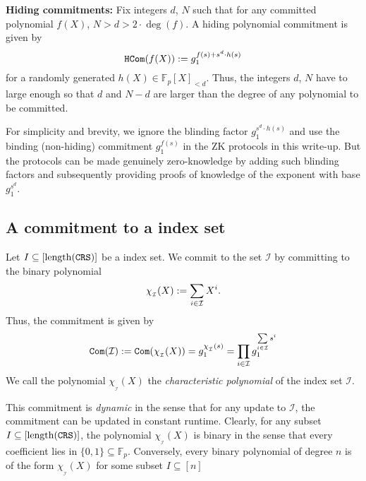 \documentclass[11pt, lettersize, notitlepage, leqno, footskip=0.6cm]{article}
\newcommand{\bFp}{\mathbb{F}_p}
\newcommand{\mc}{\mathcal}
\newcommand{\mr}{\mathrm}
\newcommand{\sub}{\subseteq}
\newcommand{\vs}{\vspace{-0.15cm}}
\newcommand{\noin}{\noindent}
\numberwithin{equation}{section}
\begin{document}
\bigskip





\begin{mdframed}

\noin \hypertarget{Hide}{\textbf{Hiding commitments:}} Fix integers $d$, $N$ such that for any committed polynomial $f(X)$, $N> d > 2\cdot \deg(f).$ A hiding polynomial commitment is given by \vs $${\tt{HCom}}(f(X)):= g_1^{f(s)+ s^d\cdot h(s)} $$ for a randomly generated $h(X)\in \bFp[X]_{< d}$. Thus, the integers $d$, $N$ have to large enough so that $d$ and $N-d$ are larger than the degree of any polynomial to be committed.

For simplicity and brevity, we ignore the blinding factor $g_1^{s^d\cdot h(s)}$ and use the binding (non-hiding) commitment $g_1^{f(s)}$ in the ZK protocols in this write-up. But the protocols can be made genuinely zero-knowledge by adding such blinding factors and subsequently providing proofs of knowledge of the exponent with base $g_1^{s^d}$.

\end{mdframed}






\vspace{2mm}


\subsection{\fontsize{11}{11}\selectfont A commitment to a index set}


Let $I\sub [ \mr{length}(\tt{CRS})]$ be a index set. We \hypertarget{Indices}{commit} to the set $\mc{I}$ by committing to the binary polynomial \vs $$\chi_{_\mc{I}}(X):= \sum\limits_{i\in \mc{I}} X^i .\vs $$ Thus, the commitment is given \hypertarget{IndexSet}{by} \vs $$ {\tt{Com}}(\mc{I}):= {\tt{Com}}(\chi_{_\mc{I}}(X))= g_1^{\chi_{_\mc{I}}(s)} = \prod\limits_{i\in \mc{I}} g_1^{\sum\limits_{i\in \mc{I}} s^i}  \vs $$ We call the polynomial $\chi_{_\mc{I}}(X)$ the \hypertarget{charpoly}{\textit{characteristic polynomial}} of the index set $\mc{I}$.

This commitment is \textit{dynamic} in the sense that for any update to $\mc{I}$, the commitment can be updated in constant runtime. Clearly, for any subset $I\sub [ \mr{length}(\tt{CRS})]$, the polynomial $\chi_{_\mc{I}}(X)$ is binary in the sense that every coefficient lies in $\{0,1 \}\sub \bFp$. Conversely, every binary polynomial of degree $n$ is of the form $\chi_{_\mc{I}}(X)$ for some subset $I\sub [ n]$
\end{document}
